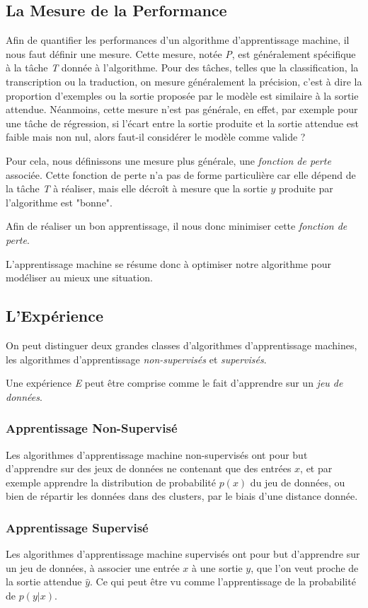 \documentclass[a4paper, 10pt]{report}
\begin{document}
\subsection{La Mesure de la Performance}
Afin de quantifier les performances d'un algorithme d'apprentissage machine, il nous faut définir une mesure. Cette mesure, notée \emph{P}, est généralement spécifique à la tâche \emph{T} donnée à l'algorithme.
Pour des tâches, telles que la classification, la transcription ou la traduction, on mesure généralement la précision, c'est à dire la proportion d'exemples ou la sortie proposée par le modèle est similaire à la sortie attendue.
Néanmoins, cette mesure n'est pas générale, en effet, par exemple pour une tâche de régression, si l'écart entre la sortie produite et la sortie attendue est faible mais non nul, alors faut-il considérer le modèle comme valide ?

Pour cela, nous définissons une mesure plus générale, une \emph{fonction de perte }associée.
Cette fonction de perte n'a pas de forme particulière car elle dépend de la tâche \emph{T} à réaliser, mais elle décroît à mesure que la sortie $y$ produite par l'algorithme est "bonne".

Afin de réaliser un bon apprentissage, il nous donc minimiser cette \emph{fonction de perte}.

L'apprentissage machine se résume donc à optimiser notre algorithme pour modéliser au mieux une situation.
		
\subsection{L'Expérience}
On peut distinguer deux grandes classes d'algorithmes d'apprentissage machines, les algorithmes d'apprentissage \emph{non-supervisés} et \emph{supervisés}.

Une expérience \emph{E} peut être comprise comme le fait d'apprendre sur un \emph{jeu de données}.
\subsubsection{Apprentissage Non-Supervisé}
Les algorithmes d'apprentissage machine non-supervisés ont pour but d'apprendre sur des jeux de données ne contenant que des entrées $x$, et par exemple apprendre la distribution de probabilité $p(x)$ du jeu de données, ou bien de répartir les données dans des clusters, par le biais d'une distance donnée.
\subsubsection{Apprentissage Supervisé}
Les algorithmes d'apprentissage machine supervisés ont pour but d'apprendre sur un jeu de données, à associer une entrée $x$ à une sortie $y$, que l'on veut proche de la sortie attendue $\hat{y}$. Ce qui peut être vu comme l'apprentissage de la probabilité de $p(y|x)$.
	
\end{document}
